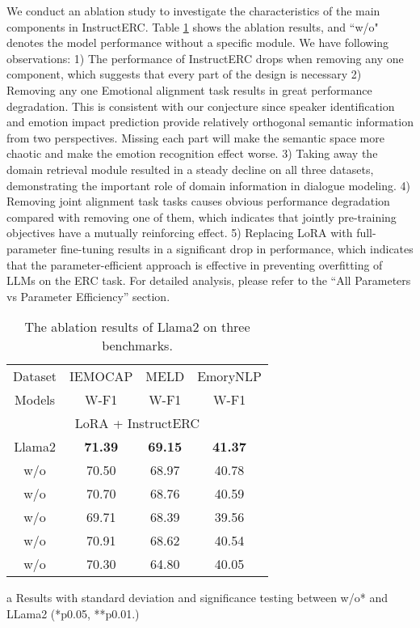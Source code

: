 \documentclass[conference]{IEEEtran}
\begin{document}
We conduct an ablation study to investigate the characteristics of the main components in InstructERC. Table \ref{tab3} shows the ablation results, and “w/o" denotes the model performance without a specific module. We have following observations: 1) The performance of InstructERC drops when removing any one component, which suggests that every part of the design is necessary 2) Removing any one Emotional alignment task results in great performance degradation. This is consistent with our conjecture since speaker identification and emotion impact prediction provide relatively orthogonal semantic information from two perspectives. Missing each part will make the semantic space more chaotic and make the emotion recognition effect worse. 3) Taking away the domain retrieval module resulted in a steady decline on all three datasets, demonstrating the important role of domain information in dialogue modeling. 4) Removing joint alignment task tasks causes obvious performance degradation compared with removing one of them, which indicates that jointly pre-training objectives have a mutually reinforcing effect. 5) Replacing LoRA with full-parameter fine-tuning results in a significant drop in performance, which indicates that the parameter-efficient approach is effective in preventing overfitting of LLMs on the ERC task. For detailed analysis, please refer to the ``All Parameters vs Parameter Efficiency'' section.

\begin{table}[htbp]
\centering
\caption{The ablation results of Llama2 on three benchmarks.}
\begin{tabular}{cccc}
\toprule
 Dataset          & IEMOCAP                    & MELD                       & EmoryNLP        \\ 
{Models}                   & {W-F1}       & {W-F1}       & {W-F1} \\ 
\midrule
\multicolumn{4}{c}{LoRA + InstructERC}       \\
\midrule 
Llama2             & \textbf{71.39} & \textbf{69.15} & \textbf{41.37}  \\
w/o  & 70.50 & 68.97 & 40.78 \\
w/o   & 70.70 & 68.76 & 40.59 \\ 
w/o     & 69.71 & 68.39 & 39.56 \\
w/o         & 70.91 & 68.62 & 40.54  \\
w/o         & 70.30 & 64.80 & 40.05 \\
\bottomrule
\end{tabular}
\begin{tablenotes}
    
\item[a] Results with standard deviation and significance testing between w/o* and LLama2 (*p0.05, **p0.01.)
\end{tablenotes}
\vspace{-0.2cm}
\label{tab3}
\end{table}
\end{document}
